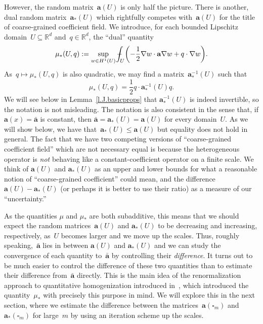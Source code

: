 \documentclass[11pt]{article} %
\let\oldsquare\square %
\renewcommand{\square}{\oldsquare}
\numberwithin{equation}{section}
\theoremstyle{definition}
\let\originalleft\left
\let\originalright\right
\renewcommand{\left}{\mathopen{}\mathclose\bgroup\originalleft}
\renewcommand{\right}{\aftergroup\egroup\originalright}
\newcommand*{\Rd}{\ensuremath{\mathbb{R}^d}}
\renewcommand{\a}{\mathbf{a}}
\newcommand{\ahom}{\bar{\a}}
\newcommand{\cu}{\square}
\def\Xint#1{\mathchoice
{\XXint\displaystyle\textstyle{#1}}%
{\XXint\textstyle\scriptstyle{#1}}%
{\XXint\scriptstyle\scriptscriptstyle{#1}}%
{\XXint\scriptscriptstyle\scriptscriptstyle{#1}}%
\!\int}
\def\XXint#1#2#3{{\setbox0=\hbox{$#1{#2#3}{\int}$}
\vcenter{\hbox{$#2#3$}}\kern-.5\wd0}}
\def\fint{\Xint-}
\begin{document}
However, the random matrix~$\a(U)$ is only half the picture. There is another, dual random matrix~$\a_*(U)$ which rightfully competes with~$\a(U)$ for the title of coarse-grained coefficient field. We introduce, for each bounded Lipschitz domain~$U\subseteq\Rd$ and~$q\in\Rd$, the ``dual'' quantity 
\begin{equation}
\label{e.mustar}
\mu_*(U,q)
:= \sup_{w\in H^1(U)} 
\fint_U \left( -\frac12\nabla w \cdot \a\nabla w + q\cdot \nabla w \right). 
\end{equation}
As~$q\mapsto \mu_*(U,q)$ is also quadratic, we may find a matrix~$\a_*^{-1}(U)$ such that
\begin{equation}
\label{e.quad.mu.star}
\mu_*(U,q) = \frac12 q\cdot \a_*^{-1}(U) q.
\end{equation}
We will see below in Lemma~\ref{l.J.basicprops} that $\a_*^{-1}(U)$ is indeed invertible, so the notation is not misleading.
The notation is also consistent in the sense that, if $\a(x)=\ahom$ is constant, then $\ahom = \a_*(U) = \a(U)$ for every domain~$U$. 
As we will show below, we have that~$\a_*(U) \leq \a(U)$ but equality does not hold in general. 
The fact that we have two competing versions of ``coarse-grained coefficient field'' which are not necessary equal is because the heterogeneous operator is \emph{not} behaving like a constant-coefficient operator on a finite scale. We think of $\a(U)$ and $\a_*(U)$ as an upper and lower bounds for what a reasonable notion of ``coarse-grained coefficient'' could mean, and the difference~$\a(U)-\a_*(U)$ (or perhaps it is better to use their ratio) as a measure of our ``uncertainty.'' 

\smallskip

As the quantities $\mu$ and $\mu_*$ are both subadditive, this means that we should expect the random matrices~$\a(U)$ and $\a_*(U)$ to be decreasing and increasing, respectively, as~$U$ becomes larger and we move up the scales. Thus, roughly speaking,~$\ahom$ lies in between $\a(U)$ and $\a_*(U)$ and we can study the convergence of each quantity to~$\ahom$ by controlling their \emph{difference}. It turns out to be much easier to control the difference of these two quantities than to estimate their difference from~$\ahom$ directly.
This is the main idea of the renormalization approach to quantitative homogenization introduced in~\cite{AS}, which introduced the quantity~$\mu_*$ with precisely this purpose in mind. 
We will explore this in the next section, where we estimate the difference between the matrices~$\a(\cu_m)$ and~$\a_*(\cu_m)$ for large~$m$ by using an iteration scheme up the scales.
\end{document}
